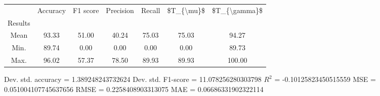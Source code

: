 \begin{tabular}{|c|c|c|c|c|c|c|}
\toprule
{} &  Accuracy &  F1 score &  Precision &  Recall &  \$T\_\{\textbackslash mu\}\$ &  \$T\_\{\textbackslash gamma\}\$ \\
Results &           &           &            &         &            &               \\
\hline
Mean    &     93.33 &     51.00 &      40.24 &   75.03 &      75.03 &         94.27 \\
Min.    &     89.74 &      0.00 &       0.00 &    0.00 &       0.00 &         89.73 \\
Max.    &     96.02 &     57.37 &      78.50 &   89.93 &      89.93 &        100.00 \\
\bottomrule
\end{tabular}

 Dev. std. accuracy = 1.389248243732624
 Dev. std. F1-score = 11.078256280303798
 $R^2$ = -0.10125823450515559
 MSE = 0.051004107745637656
 RMSE = 0.2258408903313075
 MAE = 0.06686331902322114